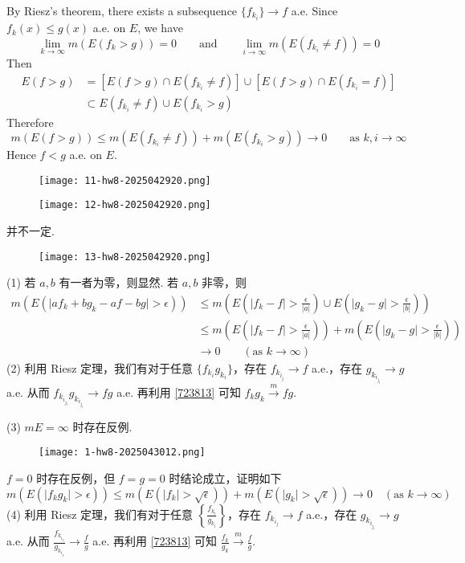 By Riesz's theorem, there exists a subsequence $\{ f_{k_i} \}\to f$ a.e. Since $f_k(x)\leq g(x)$ a.e. on $E$, we have
\[
\lim_{ k \to \infty } m(E(f_k>g))=0\qquad \text{and}\qquad \lim_{ i \to \infty } m(E(f_{k_i}\neq f))=0
\]
Then
\[
\begin{aligned}
E(f>g) & =[E(f>g)\cap E(f_{k_i}\neq f)]\cup[E(f>g)\cap E(f_{k_i}=f)] \\
 & \subset E(f_{k_i}\neq f)\cup E(f_{k_i}>g)
\end{aligned}
\]
Therefore
\[
m(E(f>g))\leq m(E(f_{k_i}\neq f))+m(E(f_{k_i}>g))\to0\qquad \text{as }k,i\to \infty
\]
Hence $f<g$ a.e. on $E$.

\begin{exercise}
\begin{figure}[H]
\centering
\texttt{[image: 11-hw8-2025042920.png]}
\label{}
\end{figure}
\begin{figure}[H]
\centering
\texttt{[image: 12-hw8-2025042920.png]}
\label{}
\end{figure}
\end{exercise}
并不一定.

\begin{exercise}
\begin{figure}[H]
\centering
\texttt{[image: 13-hw8-2025042920.png]}
\label{}
\end{figure}
\end{exercise}
(1) 若 $a,b$ 有一者为零，则显然. 若 $a,b$ 非零，则
\[
\begin{aligned}
m(E(\lvert af_k+bg_k -af-bg\rvert >\epsilon)) & \leq m\left( E\left( \lvert f_k-f \rvert >\frac{\epsilon}{\lvert a \rvert } \right)\cup E\left( \lvert g_k -g\rvert >\frac{\epsilon}{\lvert b \rvert } \right) \right) \\
 & \leq m\left( E\left( \lvert f_k-f \rvert >\frac{\epsilon}{\lvert a \rvert } \right) \right)+m\left( E\left( \lvert g_k -g\rvert>\frac{\epsilon}{\lvert b \rvert }  \right) \right) \\
 & \to0\qquad (\text{as }k\to \infty)
\end{aligned}
\]
(2)
利用 Riesz 定理，我们有对于任意 $\{ f_{k_i}g_{k_i} \}$，存在 $f_{k_{i_j}}\to f$ a.e.，存在 $g_{k_{i_{j_{l}}}}\to g$ a.e. 从而 $f_{k_{i_{j_{l}}}}g_{k_{i_{j_{l}}}}\to fg$ a.e. 再利用  \cref{723813} 可知 $f_kg_k\overset{ m }{ \to }fg$.

(3)
$mE=\infty$ 时存在反例.
\begin{figure}[H]
\centering
\texttt{[image: 1-hw8-2025043012.png]}
\label{}
\end{figure}
$f=0$ 时存在反例，但 $f=g=0$ 时结论成立，证明如下
\[
m(E(\lvert f_kg_k \rvert >\epsilon))\leq m(E(\lvert f_k \rvert >\sqrt{ \epsilon }))+m(E(\lvert g_k \rvert >\sqrt{ \epsilon }))\to0\quad (\text{as }k\to \infty)
\]
(4)
利用 Riesz 定理，我们有对于任意 $\left\{  \frac{f_{k_i}}{g_{k_i}}  \right\}$，存在 $f_{k_{i_j}}\to f$ a.e.，存在 $g_{k_{i_{j_{l}}}}\to g$ a.e. 从而 $\frac{f_{k_{i_{j_{l}}}}}{g_{k_{i_{j_{l}}}}}\to \frac{f}{g}$ a.e. 再利用  \cref{723813} 可知 $\frac{f_k}{g_k}\overset{ m }{ \to }\frac{f}{g}$.

